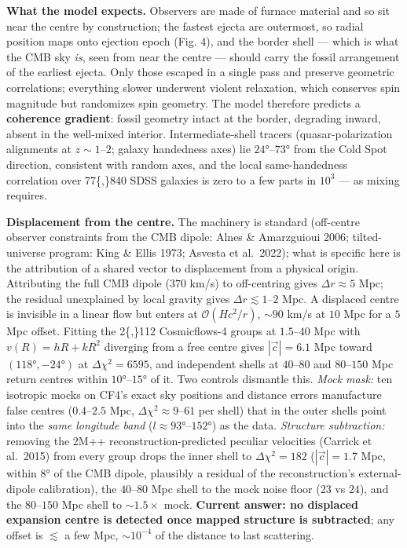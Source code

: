 \documentclass[
]{article}
\begin{document}
\textbf{What the model expects.} Observers are made of furnace material
and so sit near the centre by construction; the fastest ejecta are
outermost, so radial position maps onto ejection epoch (Fig. 4), and the
border shell --- which is what the CMB sky \emph{is}, seen from near the
centre --- should carry the fossil arrangement of the earliest ejecta.
Only those escaped in a single pass and preserve geometric correlations;
everything slower underwent violent relaxation, which conserves spin
magnitude but randomizes spin geometry. The model therefore predicts a
\textbf{coherence gradient}: fossil geometry intact at the border,
degrading inward, absent in the well-mixed interior. Intermediate-shell
tracers (quasar-polarization alignments at \(z \sim 1\)--\(2\); galaxy
handedness axes) lie \(24°\)--\(73°\) from the Cold Spot direction,
consistent with random axes, and the local same-handedness correlation
over 77\{,\}840 SDSS galaxies is zero to a few parts in \(10^3\) --- as
mixing requires.

\textbf{Displacement from the centre.} The machinery is standard
(off-centre observer constraints from the CMB dipole: Alnes \&
Amarzguioui 2006; tilted-universe program: King \& Ellis 1973; Asvesta
et al.~2022); what is specific here is the attribution of a shared
vector to displacement from a physical origin. Attributing the full CMB
dipole (\(370\) km/s) to off-centring gives \(\Delta r \approx 5\) Mpc;
the residual unexplained by local gravity gives
\(\Delta r \lesssim 1\)--\(2\) Mpc. A displaced centre is invisible in a
linear flow but enters at \(\mathcal{O}(Hc^2/r)\), \(\sim\!90\) km/s at
\(10\) Mpc for a \(5\) Mpc offset. Fitting the 2\{,\}112 Cosmicflows-4
groups at \(1.5\)--\(40\) Mpc with \(v(R) = hR + kR^2\) diverging from a
free centre gives \(|\vec c| = 6.1\) Mpc toward \((118°, -24°)\) at
\(\Delta\chi^2 = 6595\), and independent shells at \(40\)--\(80\) and
\(80\)--\(150\) Mpc return centres within \(10°\)--\(15°\) of it. Two
controls dismantle this. \emph{Mock mask:} ten isotropic mocks on CF4's
exact sky positions and distance errors manufacture false centres
(\(0.4\)--\(2.5\) Mpc, \(\Delta\chi^2 \approx 9\)--\(61\) per shell)
that in the outer shells point into the \emph{same longitude band}
(\(l \approx 93°\)--\(152°\)) as the data. \emph{Structure subtraction:}
removing the 2M++ reconstruction-predicted peculiar velocities (Carrick
et al.~2015) from every group drops the inner shell to
\(\Delta\chi^2 = 182\) (\(|\vec c| = 1.7\) Mpc, within \(8°\) of the CMB
dipole, plausibly a residual of the reconstruction's external-dipole
calibration), the \(40\)--\(80\) Mpc shell to the mock noise floor
(\(23\) vs \(24\)), and the \(80\)--\(150\) Mpc shell to
\(\sim\!1.5\times\) mock. \textbf{Current answer: no displaced expansion
centre is detected once mapped structure is subtracted}; any offset is
\(\lesssim\) a few Mpc, \(\sim\!10^{-4}\) of the distance to last
scattering.
\end{document}
